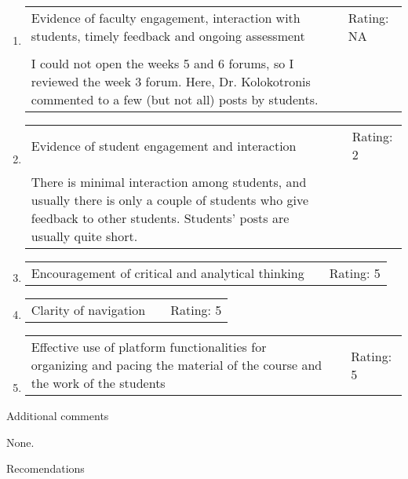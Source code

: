 \documentclass[11pt,dvipsnames]{article}
\begin{document}
\begin{enumerate}[label= {\bf  \arabic*:}]
\begin{tabular}[t]{p{}  p{3cm} p{3cm} }
\end{tabular}
\item 	\begin{tabular}[t]{p{}  p{3cm} p{3cm} }
Evidence of faculty engagement, interaction with students, timely feedback and ongoing assessment & & Rating: NA\\
& &\\
I could not open the weeks 5 and 6 forums, so I reviewed the week 3 forum. Here, Dr. Kolokotronis commented to a few (but not all) posts by students.
\end{tabular}
\item 	\begin{tabular}[t]{p{}  p{3cm} p{3cm} }
	Evidence of student engagement and interaction & & Rating: 2\\
	& &\\
	There is minimal interaction among students, and usually there is only a couple of students who give feedback to other students. Students' posts are usually quite short. & &\\
\end{tabular}
\item 	\begin{tabular}[t]{p{}  p{3cm} p{3cm} }
	Encouragement of critical and analytical thinking & & Rating: 5
\end{tabular}
\item 	\begin{tabular}[t]{p{}  p{3cm} p{3cm} }
	Clarity of navigation & & Rating: 5
\end{tabular}
\item 	\begin{tabular}[t]{p{}  p{3cm} p{3cm} }
	Effective use of platform functionalities for organizing and
	pacing the material of the course and the work of the students & & Rating: 5
\end{tabular}
\end{enumerate}
\vskip 1cm
{\large Additional comments}

None.

\vskip 1cm
{\large Recomendations}
\end{document}
